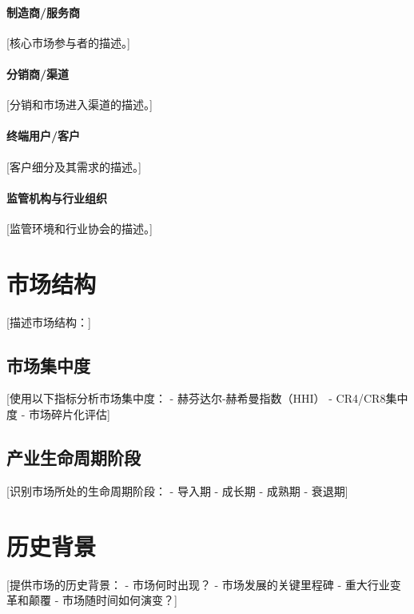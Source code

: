 \documentclass[11pt,letterpaper]{report}
\begin{document}
{\paragraph{制造商/服务商}
[核心市场参与者的描述。]

\paragraph{分销商/渠道}
[分销和市场进入渠道的描述。]

\paragraph{终端用户/客户}
[客户细分及其需求的描述。]

\paragraph{监管机构与行业组织}
[监管环境和行业协会的描述。]

\section{市场结构}


[描述市场结构：]

\subsection{市场集中度}

[使用以下指标分析市场集中度：
- 赫芬达尔-赫希曼指数（HHI）
- CR4/CR8集中度
- 市场碎片化评估]

\subsection{产业生命周期阶段}

[识别市场所处的生命周期阶段：
- 导入期
- 成长期
- 成熟期
- 衰退期]

\section{历史背景}

[提供市场的历史背景：
- 市场何时出现？
- 市场发展的关键里程碑
- 重大行业变革和颠覆
- 市场随时间如何演变？]

}
\end{document}

